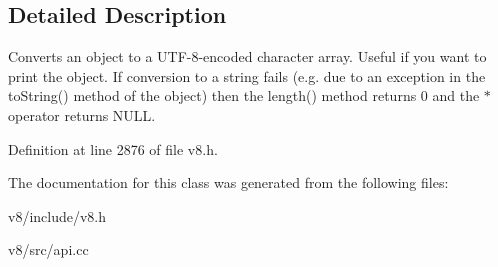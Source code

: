 \subsection{Detailed Description}
Converts an object to a U\+T\+F-\/8-\/encoded character array. Useful if you want to print the object. If conversion to a string fails (e.\+g. due to an exception in the to\+String() method of the object) then the length() method returns 0 and the $\ast$ operator returns N\+U\+LL. 

Definition at line 2876 of file v8.\+h.



The documentation for this class was generated from the following files\+:\begin{DoxyCompactItemize}
\item 
v8/include/v8.\+h\item 
v8/src/api.\+cc\end{DoxyCompactItemize}
